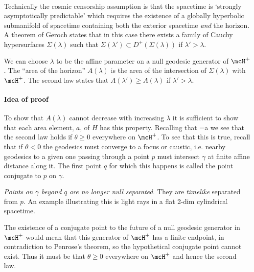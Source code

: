  \\

Technically the cosmic censorship assumption is that the spacetime is `strongly
asymptotically predictable' which requires the existence of a globally
hyperbolic submanifold of spacetime containing both the exterior spacetime
\emph{and} the horizon.  A theorem of Geroch states that in this case there
exists a family of Cauchy hypersurfaces $\Sigma(\lambda)$ such that
$\Sigma(\lambda') \subset D^+\left(\Sigma(\lambda)\right)$ if 
$\lambda'>\lambda$.
\begin{center}\end{center}
We can choose $\lambda$ to be the affine parameter on a null geodesic 
generator of $\mcH^+$.  The ``area of the horizon'' $A(\lambda)$ is the area of
the intersection of $\Sigma(\lambda)$ with $\mcH^+$.  The second law states that
$A(\lambda')\ge A(\lambda)$ if $\lambda'>\lambda$.

\paragraph{Idea of proof}  To show that $A(\lambda)$ cannot decrease with 
increasing $\lambda$ it is sufficient to show that each area element, $a$, of
$H$ has this property.  Recalling that
\be
{}=\theta a
\ee
we see that the second law holds if $\theta\ge 0$ everywhere on $\mcH^+$.  
To see that this is true, recall that if $\theta<0$ the geodesics must converge
to a focus or caustic, i.e. nearby geodesics to a given one passing through a
point $p$ must intersect $\gamma$ at finite affine distance along it.  The first
point $q$ for which this happens is called the point conjugate to $p$ on
$\gamma$.
\begin{center}\end{center}
\emph{Points on $\gamma$ beyond $q$ are no longer null separated}.  They 
are \emph{timelike} separated from $p$.  An example illustrating this is light
rays in a flat 2-dim cylindrical spacetime.
\begin{center}\end{center}
The existence of a conjugate point to the future of a null geodesic generator 
in $\mcH^+$ would mean that this generator of $\mcH^+$ has a finite endpoint,
in contradiction to Penrose's theorem, so the hypothetical conjugate point
cannot exist.  Thus it must be that $\theta\ge 0$ everywhere on $\mcH^+$ and
hence the second law.  

